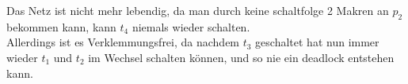 Das Netz ist nicht mehr lebendig, da man durch keine schaltfolge 2 Makren an $p_2$ bekommen kann, kann $t_4$ niemals wieder schalten.\\
Allerdings ist es Verklemmungsfrei, da nachdem $t_3$ geschaltet hat nun immer wieder $t_1$ und $t_2$ im Wechsel schalten können, und so nie ein deadlock entstehen kann.
